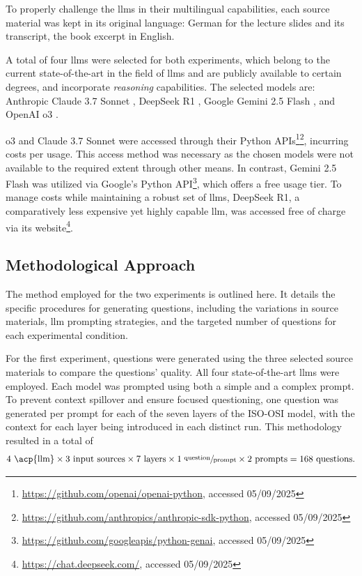 \pagebreak

To properly challenge the \acp{llm} in their multilingual capabilities, each source material was kept in its original language: German for the lecture slides and its transcript, the book excerpt in English.

 A total of four \acp{llm} were selected for both experiments, which belong to the current state-of-the-art in the field of \acp{llm} and are publicly available to certain degrees, and incorporate \textit{reasoning} capabilities. The selected models are:
Anthropic Claude 3.7 Sonnet \cite{anthropic_claude_2025},
DeepSeek R1 \cite{deepseek-ai_deepseek-r1_2025},
Google Gemini 2.5 Flash \cite{kavukcuoglu_gemini_2025}, and
OpenAI o3 \cite{openai_openai_2025-1}.

\vspace{.5em}

o3 and Claude 3.7 Sonnet were accessed through their Python APIs\footnote{\label{fn:openai-api}\url{https://github.com/openai/openai-python}, accessed 05/09/2025}\footnote{\label{fn:anthropic-api}\url{https://github.com/anthropics/anthropic-sdk-python}, accessed 05/09/2025}, incurring costs per usage. This access method was necessary as the chosen models were not available to the required extent through other means. In contrast, Gemini 2.5 Flash was utilized via Google's Python API\footnote{\label{fn:google-api}\url{https://github.com/googleapis/python-genai}, accessed 05/09/2025}, which offers a free usage tier. To manage costs while maintaining a robust set of \acp{llm}, DeepSeek R1, a comparatively less expensive yet highly capable \ac{llm}, was accessed free of charge via its website\footnote{\label{fn:deepseek}\url{https://chat.deepseek.com/}, accessed 05/09/2025}.

\subsection{Methodological Approach}
\label{sec:methodological-approach}

The method employed for the two experiments is outlined here. It details the specific procedures for generating questions, including the variations in source materials, \ac{llm} prompting strategies, and the targeted number of questions for each experimental condition.

 For the first experiment, questions were generated using the three selected source materials to compare the questions' quality. All four state-of-the-art \acp{llm} were employed. Each model was prompted using both a simple and a complex prompt. To prevent context spillover and ensure focused questioning, one question was generated per prompt for each of the seven layers of the ISO-OSI model, with the context for each layer being introduced in each distinct run. This methodology resulted in a total of
 \begin{align}4 \text{ \acp{llm}} \times 3 \text{ input sources} \times 7 \text{ layers} \times 1 \sfrac{\text{ question}}{\text{prompt}} \times 2 \text{ prompts} = 168 \text{ questions.}\end{align}

